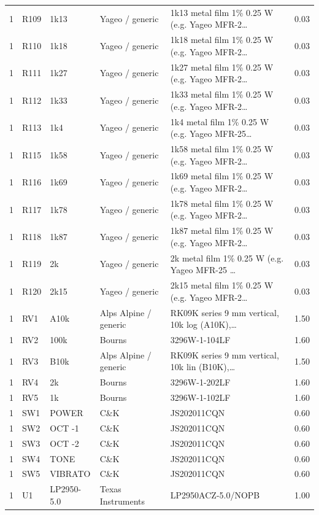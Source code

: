 \documentclass[10pt,a4paper]{article}
\begin{document}
{\begin{longtable}{rp{3.6cm}lp{2.2cm}p{4.6cm}r}
1 & R109 & 1k13 & Yageo / generic & 1k13 metal film 1\% 0.25 W (e.g. Yageo MFR-2\ldots{} & 0.03 \\
1 & R110 & 1k18 & Yageo / generic & 1k18 metal film 1\% 0.25 W (e.g. Yageo MFR-2\ldots{} & 0.03 \\
1 & R111 & 1k27 & Yageo / generic & 1k27 metal film 1\% 0.25 W (e.g. Yageo MFR-2\ldots{} & 0.03 \\
1 & R112 & 1k33 & Yageo / generic & 1k33 metal film 1\% 0.25 W (e.g. Yageo MFR-2\ldots{} & 0.03 \\
1 & R113 & 1k4 & Yageo / generic & 1k4 metal film 1\% 0.25 W (e.g. Yageo MFR-25\ldots{} & 0.03 \\
1 & R115 & 1k58 & Yageo / generic & 1k58 metal film 1\% 0.25 W (e.g. Yageo MFR-2\ldots{} & 0.03 \\
1 & R116 & 1k69 & Yageo / generic & 1k69 metal film 1\% 0.25 W (e.g. Yageo MFR-2\ldots{} & 0.03 \\
1 & R117 & 1k78 & Yageo / generic & 1k78 metal film 1\% 0.25 W (e.g. Yageo MFR-2\ldots{} & 0.03 \\
1 & R118 & 1k87 & Yageo / generic & 1k87 metal film 1\% 0.25 W (e.g. Yageo MFR-2\ldots{} & 0.03 \\
1 & R119 & 2k & Yageo / generic & 2k metal film 1\% 0.25 W (e.g. Yageo MFR-25 \ldots{} & 0.03 \\
1 & R120 & 2k15 & Yageo / generic & 2k15 metal film 1\% 0.25 W (e.g. Yageo MFR-2\ldots{} & 0.03 \\
1 & RV1 & A10k & Alps Alpine / generic & RK09K series 9 mm vertical, 10k log (A10K),\ldots{} & 1.50 \\
1 & RV2 & 100k & Bourns & 3296W-1-104LF & 1.60 \\
1 & RV3 & B10k & Alps Alpine / generic & RK09K series 9 mm vertical, 10k lin (B10K),\ldots{} & 1.50 \\
1 & RV4 & 2k & Bourns & 3296W-1-202LF & 1.60 \\
1 & RV5 & 1k & Bourns & 3296W-1-102LF & 1.60 \\
1 & SW1 & POWER & C\&K & JS202011CQN & 0.60 \\
1 & SW2 & OCT -1 & C\&K & JS202011CQN & 0.60 \\
1 & SW3 & OCT -2 & C\&K & JS202011CQN & 0.60 \\
1 & SW4 & TONE & C\&K & JS202011CQN & 0.60 \\
1 & SW5 & VIBRATO & C\&K & JS202011CQN & 0.60 \\
1 & U1 & LP2950-5.0 & Texas Instruments & LP2950ACZ-5.0/NOPB & 1.00 \\

\end{longtable}}
\end{document}
